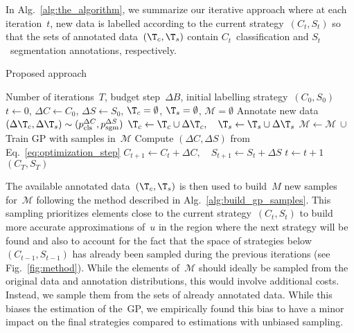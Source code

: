 In Alg.~\ref{alg:the_algorithm}, we summarize our iterative approach where at each iteration~$t$, new data is labelled according to the current strategy~$(C_t, S_t)$ so that the sets of annotated data~$(\T_c, \T_s)$ contain $C_t$~classification and $S_t$~segmentation annotations, respectively. 
\begin{algorithm}[!b]
\caption{Proposed approach}
\label{alg:the_algorithm}
\begin{algorithmic}[1]
\Require Number of iterations~$T$, budget step~$\Delta{}B$, initial labelling strategy~$(C_0, S_0)$
\State $t\leftarrow 0$, $\Delta{}C\leftarrow C_0$, $\Delta{}S\leftarrow S_0$, $\T_c=\emptyset$, $\T_s=\emptyset$, $\mathcal{M}=\emptyset$
\State Annotate new data $(\Delta{}\T_c,\Delta{}\T_s)\sim{}(p_\textrm{cls}^{\Delta{}C}, p_\textrm{sgm}^{\Delta{}S})$
\State $\T_c \leftarrow \T_c \cup \Delta{}\T_c, \quad \T_s \leftarrow \T_s \cup \Delta{}\T_s$ 
\State $\mathcal{M} \leftarrow \mathcal{M} \,\cup\,$ 
\State Train GP with samples in~$\mathcal{M}$
\State Compute $(\Delta{}C, \Delta{}S)$ from Eq.~\eqref{eq:optimization_step}
\State $C_{t+1} \leftarrow C_t + \Delta{}C, \quad S_{t+1} \leftarrow S_t + \Delta{}S$
\State $t\leftarrow t+1$
\EndWhile
\Ensure $(C_T, S_T)$
\end{algorithmic}
\end{algorithm}
The available annotated data~$(\T_c, \T_s)$ is then used to build~$M$ new samples for~$\mathcal{M}$ following the method described in Alg.~\ref{alg:build_gp_samples}. This sampling prioritizes elements close to the current strategy~$(C_t, S_t)$ to build more accurate approximations of~$u$ in the region where the next strategy will be found and also to account for the fact that the space of strategies below~$(C_{t-1}, S_{t-1})$ has already been sampled during the previous iterations (see Fig.~\ref{fig:method}). While the elements of~$\mathcal{M}$ should ideally be sampled from the original data and annotation distributions, this would involve additional costs. Instead, we sample them from the sets of already annotated data. While this biases the estimation of the~GP, we empirically found this bias to have a minor impact on the final strategies compared to estimations with unbiased sampling.

